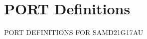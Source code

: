 \hypertarget{group___s_a_m_d21_g17_a_u__port}{}\section{P\+O\+RT Definitions}
\label{group___s_a_m_d21_g17_a_u__port}
P\+O\+RT D\+E\+F\+I\+N\+I\+T\+I\+O\+NS F\+OR S\+A\+M\+D21\+G17\+AU 